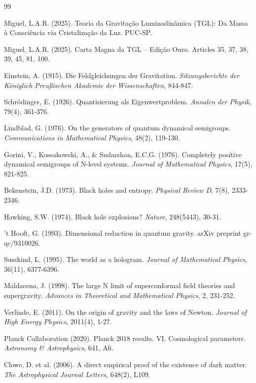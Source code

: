 \documentclass[12pt,a4paper]{article}
\begin{document}
\begin{thebibliography}{99}

Miguel, L.A.R. (2025). Teoria da Gravitação Luminodinâmica (TGL): Da Massa à Consciência via Cristalização da Luz. PUC-SP.

Miguel, L.A.R. (2025). Carta Magna da TGL – Edição Ouro. Articles 35, 37, 38, 39, 45, 81, 100.

Einstein, A. (1915). Die Feldgleichungen der Gravitation. \textit{Sitzungsberichte der Königlich Preußischen Akademie der Wissenschaften}, 844-847.

Schrödinger, E. (1926). Quantisierung als Eigenwertproblem. \textit{Annalen der Physik}, 79(4), 361-376.

Lindblad, G. (1976). On the generators of quantum dynamical semigroups. \textit{Communications in Mathematical Physics}, 48(2), 119-130.

Gorini, V., Kossakowski, A., \& Sudarshan, E.C.G. (1976). Completely positive dynamical semigroups of N-level systems. \textit{Journal of Mathematical Physics}, 17(5), 821-825.

Bekenstein, J.D. (1973). Black holes and entropy. \textit{Physical Review D}, 7(8), 2333-2346.

Hawking, S.W. (1974). Black hole explosions? \textit{Nature}, 248(5443), 30-31.

't Hooft, G. (1993). Dimensional reduction in quantum gravity. arXiv preprint gr-qc/9310026.

Susskind, L. (1995). The world as a hologram. \textit{Journal of Mathematical Physics}, 36(11), 6377-6396.

Maldacena, J. (1998). The large N limit of superconformal field theories and supergravity. \textit{Advances in Theoretical and Mathematical Physics}, 2, 231-252.

Verlinde, E. (2011). On the origin of gravity and the laws of Newton. \textit{Journal of High Energy Physics}, 2011(4), 1-27.

Planck Collaboration (2020). Planck 2018 results. VI. Cosmological parameters. \textit{Astronomy \& Astrophysics}, 641, A6.

Clowe, D. et al. (2006). A direct empirical proof of the existence of dark matter. \textit{The Astrophysical Journal Letters}, 648(2), L109.


\end{thebibliography}
\end{document}
